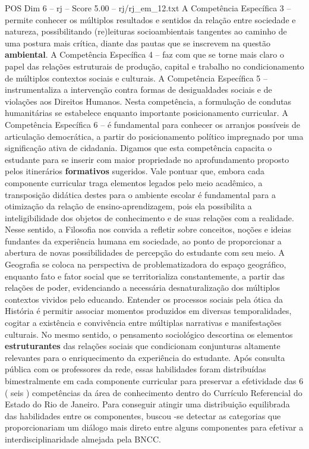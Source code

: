 \begin{textsample}{POS Dim 6 – rj – Score 5.00 – rj/rj\_em\_12.txt}
A Competência Específica 3 – permite conhecer os múltiplos resultados e sentidos da relação entre sociedade e natureza, possibilitando (re)leituras socioambientais tangentes ao caminho de uma postura mais crítica, diante das pautas que se inscrevem na questão \textbf{ambiental}.
A Competência Específica 4 – faz com que se torne mais claro o papel das relações estruturais de produção, capital e trabalho no condicionamento de múltiplos contextos sociais e culturais.
A Competência Específica 5 – instrumentaliza a intervenção contra formas de desigualdades sociais e de violações aos Direitos Humanos.
Nesta competência, a formulação de condutas humanitárias se estabelece enquanto importante posicionamento curricular.
A Competência Específica 6 – é fundamental para conhecer os arranjos possíveis de articulação democrática, a partir do posicionamento político impregnado por uma significação ativa de cidadania.
Digamos que esta competência capacita o estudante para se inserir com maior propriedade no aprofundamento proposto pelos itinerários \textbf{formativos} sugeridos.
Vale pontuar que, embora cada componente curricular traga elementos legados pelo meio acadêmico, a transposição didática destes para o ambiente escolar é fundamental para a otimização da relação de ensino-aprendizagem, pois ela possibilita a inteligibilidade dos objetos de conhecimento e de suas relações com a realidade.
Nesse sentido, a Filosofia nos convida a refletir sobre conceitos, noções e ideias fundantes da experiência humana em sociedade, ao ponto de proporcionar a abertura de novas possibilidades de percepção do estudante com seu meio.
A Geografia se coloca na perspectiva de problematizadora do espaço geográfico, enquanto fato e fator social que se territorializa constantemente, a partir das relações de poder, evidenciando a necessária desnaturalização dos múltiplos contextos vividos pelo educando.
Entender os processos sociais pela ótica da História é permitir associar momentos produzidos em diversas temporalidades, cogitar a existência e convivência entre múltiplas narrativas e manifestações culturais.
No mesmo sentido, o pensamento sociológico descortina os elementos \textbf{estruturantes} das relações sociais que condicionam conjunturas altamente relevantes para o enriquecimento da experiência do estudante.
Após consulta pública com os professores da rede, essas habilidades foram distribuídas bimestralmente em cada componente curricular para preservar a efetividade das 6 ( seis ) competências da área de conhecimento dentro do Currículo Referencial do Estado do Rio de Janeiro.
Para conseguir atingir uma distribuição equilibrada das habilidades entre os componentes, buscou -se detectar as categorias que proporcionariam um diálogo mais direto entre alguns componentes para efetivar a interdisciplinaridade almejada pela BNCC.

\end{textsample}
